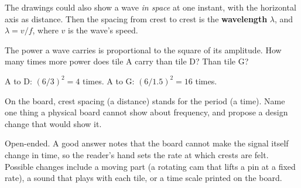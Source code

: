 \documentclass[11pt,addpoints]{exam}
\begin{document}
\begin{questions}
\question The drawings could also show a wave \emph{in space} at one instant, with the horizontal
axis as distance. Then the spacing from crest to crest is the \textbf{wavelength} \(\lambda\), and
\(\lambda = v/f\), where \(v\) is the wave's speed.

\question[3] The power a wave carries is proportional to the square of its amplitude. How many
times more power does tile A carry than tile D? Than tile G?
\begin{solution}
A to D: \((6/3)^2 = 4\) times. A to G: \((6/1.5)^2 = 16\) times.
\end{solution}
\vspace{1.6cm}

\question[3] On the board, crest spacing (a distance) stands for the period (a time). Name one
thing a physical board cannot show about frequency, and propose a design change that would show
it.
\begin{solution}
Open-ended. A good answer notes that the board cannot make the signal itself change in time, so
the reader's hand sets the rate at which crests are felt. Possible changes include a moving part
(a rotating cam that lifts a pin at a fixed rate), a sound that plays with each tile, or a time
scale printed on the board.
\end{solution}
\vspace{2.2cm}

\end{questions}

\vfill
{}
\end{document}
